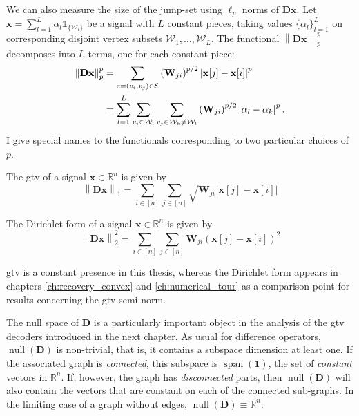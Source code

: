 We can also measure the size of the jump-set using $\ell_p$ norms of $\mathbf{Dx}$. Let $\mathbf{x} = \sum_{l=1}^{L} \alpha_l \mathbb{1}_{\{ \mathcal{W}_l \}}$ be a signal with $L$ constant pieces, taking values $\{ \alpha_l \}_{l=1}^{L}$ on corresponding disjoint vertex subsets $\mathcal{W}_1, \dots, \mathcal{W}_L$. The functional $\left \| \mathbf{D x} \right \|_p^p$ decomposes into $L$ terms, one for each constant piece:
\begin{align}
    \left \| \mathbf{D x} \right \|_p^p & = \sum_{e = (v_i,v_j) \in \mathcal{E}} \left(\mathbf{W}_{ji}\right)^{p/2} \left | \mathbf{x}[j] - \mathbf{x}[i] \right |^p \\
    & = \sum_{l=1}^{L} \sum_{v_i \in \mathcal{W}_l} \sum_{v_j \in \mathcal{W}_k \neq \mathcal{W}_l} \left(\mathbf{W}_{ji}\right)^{p/2} \left | \alpha_l - \alpha_k \right |^p. \nonumber
\end{align}
I give special names to the functionals corresponding to two particular choices of $p$.

\begin{definition}
    The \acrlong{gtv} of a signal $\mathbf{x} \in \mathbb{R}^{n}$ is given by
    \begin{equation}
        \left \| \mathbf{D x} \right \|_1 = \sum_{i \in [n]} \sum_{j \in [n]} \sqrt{\mathbf{W}_{ji}} \left | \mathbf{x}[j] - \mathbf{x}[i] \right |
    \end{equation}
    \label{def:gtv}
\end{definition}

\begin{definition}
    The Dirichlet form of a signal $\mathbf{x} \in \mathbb{R}^{n}$ is given by
    \begin{equation}
        \left \| \mathbf{D x} \right \|_2^2 = \sum_{i \in [n]} \sum_{j \in [n]} \mathbf{W}_{ji} \left ( \mathbf{x}[j] - \mathbf{x}[i] \right )^2
    \end{equation}
    \label{def:dirichlet_form}
\end{definition}

\acrlong{gtv} is a constant presence in this thesis, whereas the Dirichlet form appears in chapters \ref{ch:recovery_convex} and \ref{ch:numerical_tour} as a comparison point for results concerning the \acrshort{gtv} semi-norm.

The null space of $\mathbf{D}$ is a particularly important object in the analysis of the \acrshort{gtv} decoders introduced in the next chapter. As usual for difference operators, $\operatorname{null} \left ( \mathbf{D} \right )$ is non-trivial, that is, it contains a subspace dimension at least one. If the associated graph is \emph{connected}, this subspace is $\operatorname{span}(\mathbf{1})$, the set of \emph{constant} vectors in $\mathbb{R}^{n}$. If, however, the graph has \emph{disconnected} parts, then $\operatorname{null} \left ( \mathbf{D} \right )$ will also contain the vectors that are constant on each of the connected sub-graphs. In the limiting case of a graph without edges, $\operatorname{null} \left ( \mathbf{D} \right ) \equiv \mathbb{R}^{n}$.


